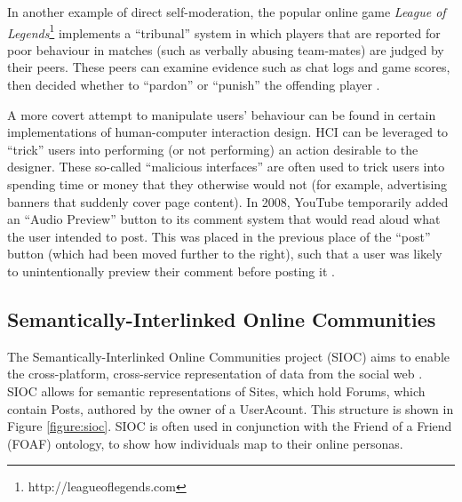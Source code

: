 In another example of direct self-moderation, the popular online game \textit{League of Legends}\footnote{http://leagueoflegends.com} implements a ``tribunal'' system in which players that are reported for poor behaviour in matches (such as verbally abusing team-mates) are judged by their peers. These peers can examine evidence such as chat logs and game scores, then decided whether to ``pardon'' or ``punish'' the offending player \citep{Hodson2013, kou2013regulating}.

A more covert attempt to manipulate users' behaviour can be found in certain implementations of human-computer interaction design. HCI can be leveraged to ``trick'' users into performing (or not performing) an action desirable to the designer. These so-called ``malicious interfaces'' \citep{Conti2010} are often used to trick users into spending time or money that they otherwise would not (for example, advertising banners that suddenly cover page content). In 2008, YouTube temporarily added an ``Audio Preview'' button to its comment system that would read aloud what the user intended to post. This was placed in the previous place of the ``post'' button (which had been moved further to the right), such that a user was likely to unintentionally preview their comment before posting it \citep{Munroe2008}.


\subsection{Semantically-Interlinked Online Communities}
The Semantically-Interlinked Online Communities project (SIOC) aims to enable the cross-platform, cross-service representation of data from the social web \citep{Breslin2006}. SIOC allows for semantic representations of Sites, which hold Forums, which contain Posts, authored by the owner of a UserAcount. This structure is shown in Figure \ref{figure:sioc}. SIOC is often used in conjunction with the Friend of a Friend (FOAF) ontology, to show how individuals map to their online personas.

